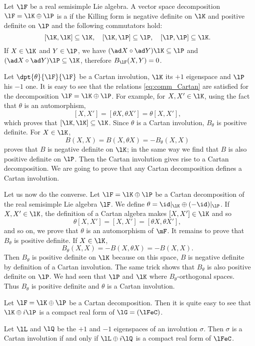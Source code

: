 Let $\lF$ be a real semisimple Lie algebra. A vector space decomposition $\lF=\lK\oplus\lP$ is a  if the Killing form is negative definite on $\lK$ and positive definite on $\lP$ and the following commutators hold:
\begin{equation}\label{eq:comm_Cartan}
   [\lK,\lK]\subseteq\lK,\quad[\lK,\lP]\subseteq\lP,\quad[\lP,\lP]\subseteq\lK.
\end{equation}
If $X\in\lK$ and $Y\in\lP$, we have $(\ad X\circ\ad Y)\lK\subseteq\lP$ and $(\ad X\circ\ad Y)\lP\subseteq\lK$, therefore $B_{\lF}(X,Y)=0$.

Let $\dpt{\theta}{\lF}{\lF}$ be a Cartan involution, $\lK$ its $+1$ eigenspace and $\lP$ his $-1$ one. It is easy to see that the relations \eqref{eq:comm_Cartan} are satisfied for the decomposition  $\lF=\lK\oplus\lP$. For example, for $X,X'\in\lK$, using the fact that $\theta$ is an automorphism,
\[
   [X,X']=[\theta X,\theta X']=\theta[X,X'],
\]
which proves that $[\lK,\lK]\subseteq\lK$. Since $\theta$ is a Cartan involution, $B_{\theta}$ is positive definite. For $X\in\lK$,
\[
  B(X,X)=B(X,\theta X)=-B_{\theta}(X,X)
\]
proves that $B$ is negative definite on $\lK$; in the same way we find that $B$ is also positive definite on $\lP$. Then the Cartan involution gives rise to a Cartan decomposition. We are going to prove that any Cartan decomposition defines a Cartan involution.

Let us now do the converse. Let $\lF=\lK\oplus\lP$ be a Cartan decomposition of the real semisimple Lie algebra $\lF$. We define $\theta=\id|_{\lK}\oplus(-\id)|_{\lP}$. If $X,X'\in\lK$, the definition of a Cartan algebra makes $[X,X']\in\lK$ and so
\[
  \theta[X,X']=[X,X']=[\theta X,\theta X'],
\]
and so on, we prove that $\theta$ is an automorphism of $\mF$. It remains to prove that $B_{\theta}$ is positive definite. If $X\in\lK$,
\[
   B_{\theta}(X,X)=-B(X,\theta X)=-B(X,X).
\]
Then $B_{\theta}$ is positive definite on $\lK$ because on this space, $B$ is negative definite by definition of a Cartan involution. The same trick shows that $B_{\theta}$ is also positive definite on $\lP$. We had seen that $\lP$ and $\lK$ where $B_{\theta}$-orthogonal spaces. Thus $B_{\theta}$ is positive definite and $\theta$ is a Cartan involution.

Let $\lF=\lK\oplus\lP$ be a Cartan decomposition. Then it is quite easy to see that $\lK\oplus i\lP$ is a compact real form of $\lG=(\lFeC)$.

\begin{proposition}
Let $\lL$ and $\lQ$ be the $+1$ and $-1$ eigenspaces of an involution $\sigma$. Then $\sigma$ is a Cartan involution if and only if $\lL\oplus i\lQ$ is  a compact real form of $\lFeC$.
\end{proposition}

